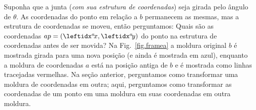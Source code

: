 
Suponha que a junta (\emph{com sua estrutura de coordenadas}) seja girada pelo ângulo de $\theta$. As coordenadas do ponto em relação a $b$ permanecem as mesmas, mas a estrutura de coordenadas se moveu, então perguntamos: Quais são as coordenadas $ap=(\ax,\ay)$ do ponto na estrutura de coordenadas antes de ser movida? Na Fig.~\ref{fig.framea} a moldura original $b$ é mostrada girada para uma nova posição (e ainda é mostrada em azul), enquanto a moldura de coordenadas $a$ está na posição antiga de $b$ e é mostrada como linhas tracejadas vermelhas. Na seção anterior, perguntamos como transformar uma moldura de coordenadas em outra; aqui, perguntamos como transformar as coordenadas de um ponto em uma moldura em suas coordenadas em outra moldura.

